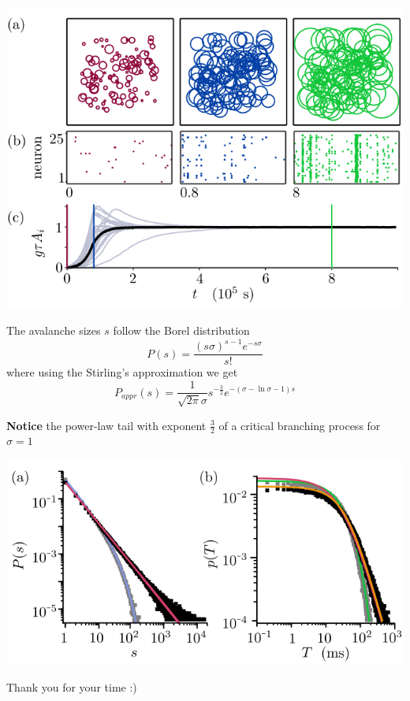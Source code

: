 \documentclass[xcolor=dvipsnames, professionalfont]{beamer}
\begin{document}
	\begin{frame}
	\centering
	\includegraphics[width=.8\linewidth]{img/simulation.png}
	
\end{frame}

	\begin{frame}
			The avalanche sizes $s$ follow the Borel distribution 
		\begin{equation}
			P(s) = \frac{(s\sigma)^{s-1} e^{-s\sigma}}{s!}
		\end{equation}
	where using the Stirling's approximation we get
	\begin{equation}
		P_{appr}(s) = \frac{1}{\sqrt{2\pi}\sigma} s^{-\frac{3}{2}} e^{-(\sigma - \ln \sigma - 1)s}
	\end{equation}
	\pause
	
	\textbf{Notice} the power-law tail with exponent $\frac{3}{2}$ of a critical branching process for $\sigma = 1$
	\end{frame}

	\begin{frame}
		\centering
		\includegraphics[width=\linewidth]{img/avalanches.png}
	\end{frame}

	\begin{frame}
		\centering
		\Large
		Thank you for your time :)
	\end{frame}
	
	
\end{document}
